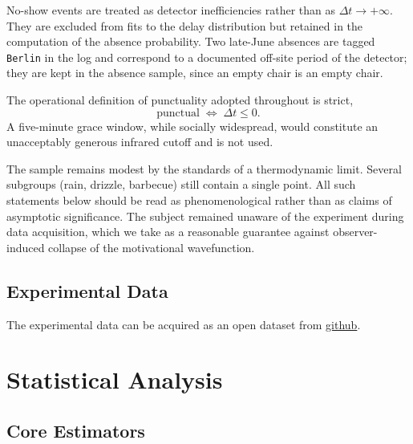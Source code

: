 \documentclass[10pt,twocolumn]{article}
\begin{document}
No-show events are treated as detector inefficiencies rather than
as $\Delta t\to+\infty$. They are excluded from fits to the delay
distribution but retained in the computation of the absence
probability. Two late-June absences are tagged \texttt{Berlin}
in the log and correspond to a documented off-site period of the
detector; they are kept in the absence sample, since an empty
chair is an empty chair.

The operational definition of punctuality adopted throughout is
strict,
\begin{equation}
    \text{punctual} \;\Longleftrightarrow\; \Delta t \le 0.
\end{equation}
A five-minute grace window, while socially widespread, would
constitute an unacceptably generous infrared cutoff and is not
used.

The sample remains modest by the standards of a thermodynamic
limit. Several subgroups (rain, drizzle, barbecue) still contain
a single point. All such statements below should be read as
phenomenological rather than as claims of asymptotic significance.
The subject remained unaware of the experiment during data
acquisition, which we take as a reasonable guarantee against
observer-induced collapse of the motivational wavefunction.

\subsection*{Experimental Data}

The experimental data can be acquired as an open dataset from \href{https://github.com/kathamatician/chronostatistics}{github}.

\section{Statistical Analysis}

\subsection{Core Estimators}
\end{document}
